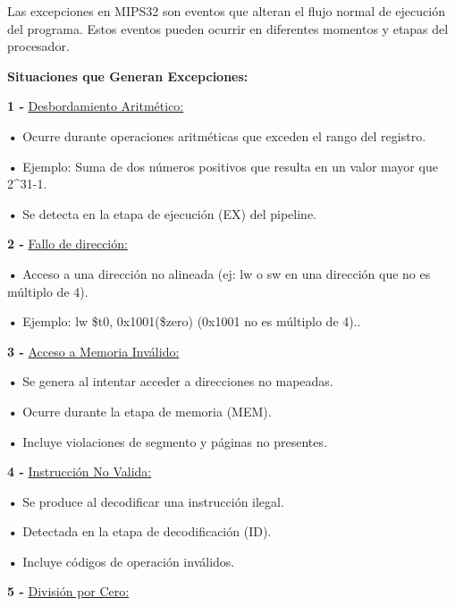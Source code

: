 \documentclass{article}
\begin{document}
\quad

{Las excepciones en MIPS32 son eventos que alteran el flujo normal de ejecución del programa. Estos eventos pueden ocurrir en diferentes momentos y etapas del procesador.}

\quad

\textbf{ Situaciones que Generan Excepciones: }

\quad

\textbf{1 -  } {\underline{Desbordamiento Aritmético: }}

\quad

\textbf{    •} { Ocurre durante operaciones aritméticas que exceden el rango del registro.}

\textbf{    •} { Ejemplo: Suma de dos números positivos que resulta en un valor mayor que 2^31-1.}

\textbf{    •} { Se detecta en la etapa de ejecución (EX) del pipeline.}

\quad

\textbf{2 -  } {\underline{Fallo de dirección: }}

\quad

\textbf{    •} { Acceso a una dirección no alineada (ej: lw o sw en una dirección que no es múltiplo de 4).}

\textbf{    •} { Ejemplo: lw \$t0, 0x1001(\$zero) (0x1001 no es múltiplo de 4)..}

\quad

\textbf{3 -  } {\underline{Acceso a Memoria Inválido: }}

\quad

\textbf{    •} { Se genera al intentar acceder a direcciones no mapeadas.}

\textbf{    •} { Ocurre durante la etapa de memoria (MEM).}

\textbf{    •} { Incluye violaciones de segmento y páginas no presentes.}

\quad

\textbf{4 -  } {\underline{Instrucción No Valida: }}

\quad

\textbf{    •} { Se produce al decodificar una instrucción ilegal.}

\textbf{    •} { Detectada en la etapa de decodificación (ID).}

\textbf{    •} { Incluye códigos de operación inválidos.}

\quad

\textbf{5 -  } {\underline{División por Cero: }}

\quad
\end{document}
